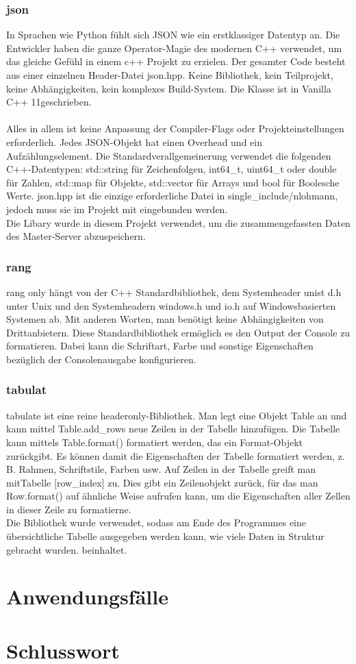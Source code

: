 \documentclass[a4paper,12pt]{article}
\begin{document}
\subsubsection{json}
In Sprachen wie Python fühlt sich JSON wie ein erstklassiger Datentyp an.
Die Entwickler haben die ganze Operator-Magie des modernen C++ verwendet, um das gleiche Gefühl in einem c++ Projekt zu erzielen. 
Der gesamter Code besteht aus einer einzelnen Header-Datei json.hpp. Keine Bibliothek, kein Teilprojekt, keine Abhängigkeiten, kein komplexes Build-System. 
Die Klasse ist in Vanilla C++ 11geschrieben. \\\\
Alles in allem ist keine Anpassung der Compiler-Flags oder Projekteinstellungen erforderlich.
Jedes JSON-Objekt hat einen Overhead und ein Aufzählungselement. Die Standardverallgemeinerung verwendet die folgenden C++-Datentypen: std::string für Zeichenfolgen, int64\_t, uint64\_t oder double für Zahlen, std::map für Objekte, std::vector für Arrays und bool für Boolesche Werte. 
json.hpp ist die einzige erforderliche Datei in single\_include/nlohmann, jedoch muss sie im Projekt mit eingebunden werden. \\
Die Libary wurde in diesem Projekt verwendet, um die zusammengefassten Daten des Master-Server abzuspeichern.
\cite{json}
\subsubsection{rang}
rang only hängt von der C++ Standardbibliothek, dem Systemheader unist d.h unter Unix und den Systemheadern windows.h und io.h auf Windows\-basierten Systemen ab. Mit anderen Worten, man benötigt keine Abhängigkeiten von Drittanbietern. Diese Standardbibliothek ermöglich es den
Output der Console zu formatieren. Dabei kann die Schriftart, Farbe und sonstige Eigenschaften bezüglich der Consolenausgabe konfigurieren.
\cite{rang}
\newpage
\noindent
\subsubsection{tabulat}
tabulate ist eine reine headeronly-Bibliothek. 
Man legt eine Objekt Table an und kann mittel Table.add\_rows neue Zeilen in der Tabelle hinzufügen.
Die Tabelle kann mittels Table.format() formatiert werden, das ein Format-Objekt zurückgibt. 
Es können damit die Eigenschaften der Tabelle formatiert werden, z. B. Rahmen, Schriftstile, Farben usw.
Auf Zeilen in der Tabelle greift man mitTabelle [row\_index] zu. Dies gibt ein Zeilenobjekt zurück, für das man Row.format() auf ähnliche Weise aufrufen kann, um die Eigenschaften aller Zellen in dieser Zeile zu formatierne.\\
Die Bibliothek wurde verwendet, sodass am Ende des Programmes eine übersichtliche Tabelle ausgegeben werden kann, wie viele Daten in Struktur gebracht wurden.
beinhaltet.
\cite{tabulate}
\section{Anwendungsfälle}

\section{Schlusswort}
\newpage
\printbibliography
\end{document}
